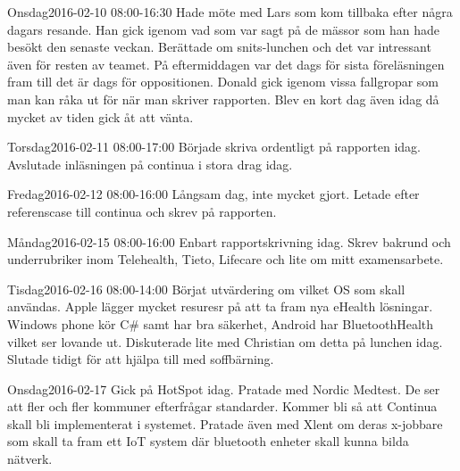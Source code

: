 \documentclass[a4paper,oneside]{book}
\begin{document}
\begin{diary}{Onsdag}{2016-02-10 08:00-16:30}
	Hade möte med Lars som kom tillbaka efter några dagars resande. Han gick igenom vad som var sagt på de mässor som han hade besökt den senaste veckan. Berättade om snits-lunchen och det var intressant även för resten av teamet. På eftermiddagen var det dags för sista föreläsningen fram till det är dags för oppositionen. Donald gick igenom vissa fallgropar som man kan råka ut för när man skriver rapporten. Blev en kort dag även idag då mycket av tiden gick åt att vänta.
\end{diary}

\begin{diary}{Torsdag}{2016-02-11 08:00-17:00}
	Började skriva ordentligt på rapporten idag. Avslutade inläsningen på continua i stora drag idag. 
\end{diary}

\begin{diary}{Fredag}{2016-02-12 08:00-16:00}
	Långsam dag, inte mycket gjort. Letade efter referenscase till continua och skrev på rapporten.
\end{diary}
\newpage

\begin{diary}{Måndag}{2016-02-15 08:00-16:00}
	Enbart rapportskrivning idag. Skrev bakrund och underrubriker inom Telehealth, Tieto, Lifecare och lite om mitt examensarbete.
\end{diary}

\begin{diary}{Tisdag}{2016-02-16 08:00-14:00}
	Börjat utvärdering om vilket OS som skall användas. Apple lägger mycket resuresr på att ta fram nya eHealth lösningar. Windows phone kör C\# samt har bra säkerhet, Android har BluetoothHealth vilket ser lovande ut. Diskuterade lite med Christian om detta på lunchen idag. Slutade tidigt för att hjälpa till med soffbärning. 
\end{diary}

\begin{diary}{Onsdag}{2016-02-17}
	Gick på HotSpot idag. Pratade med Nordic Medtest. De ser att fler och fler kommuner efterfrågar standarder. Kommer bli så att Continua skall bli implementerat i systemet. Pratade även med Xlent om deras x-jobbare som skall ta fram ett IoT system där bluetooth enheter skall kunna bilda nätverk.
\end{diary}
\end{document}
